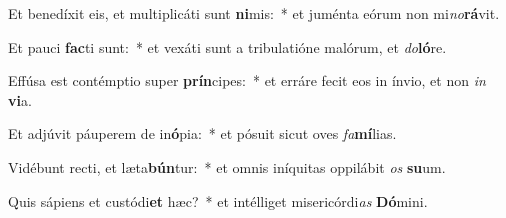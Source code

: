 \item Et benedíxit eis, et multiplicáti sunt \textbf{ni}mis:~* et juménta eórum non mi\textit{no}\textbf{rá}vit.
\item Et pauci \textbf{fac}ti sunt:~* et vexáti sunt a tribulatióne malórum, et \textit{do}\textbf{ló}re.
\item Effúsa est contémptio super \textbf{prín}cipes:~* et erráre fecit eos in ínvio, et non \textit{in} \textbf{vi}a.
\item Et adjúvit páuperem de in\textbf{ó}pia:~* et pósuit sicut oves \textit{fa}\textbf{mí}lias.
\item Vidébunt recti, et læta\textbf{bún}tur:~* et omnis iníquitas oppilábit \textit{os} \textbf{su}um.
\item Quis sápiens et custódi\textbf{et} hæc?~* et intélliget misericórdi\textit{as} \textbf{Dó}mini.
